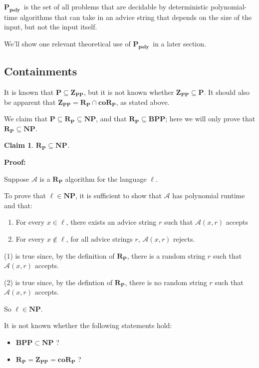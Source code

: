 \documentclass[11pt]{article}
\newcommand{\Pt}{\ensuremath{\mathbf{P}}}
\newcommand{\NP}{\ensuremath{\mathbf{NP}}}
\newcommand{\BPP}{\ensuremath{\mathbf{BPP}}}
\newcommand{\ZPP}{\ensuremath{\mathbf{Z_{PP}}}}
\newcommand{\RP}{\ensuremath{\mathbf{R_{P}}}}
\newcommand{\coRP}{\ensuremath{\mathbf{coR_{P}}}}
\newcommand{\Ppoly}{\ensuremath{\mathbf{P_{poly}}}}
\newcommand{\Alg}{\ensuremath{\mathcal{A}}}
\newtheorem{claim}[theorem]{Claim}
\begin{document}
\Ppoly\ is the set of all problems that are decidable by deterministic polynomial-time algorithms that can take in an advice string that depends on the size of the input, but not the input itself.

We'll show one relevant theoretical use of \Ppoly\ in a later section.

\subsection{Containments}

It is known that $\Pt\subseteq\ZPP$, but it is not known whether $\ZPP\subseteq\Pt$.
It should also be apparent that $\ZPP = \RP\cap\coRP$, as stated above.

We claim that $\Pt\subseteq\RP\subseteq\NP$, and that $\RP\subseteq\BPP$; here we will only prove that $\RP\subseteq\NP$.

\begin{claim}
$\RP \subseteq \NP$.
\end{claim}

\begin{leftbar}

\textbf{Proof:}

Suppose $\Alg$ is a $\RP$ algorithm for the language $\ell$.

To prove that $\ell \in \NP$, it is sufficient to show that $\Alg$ has polynomial runtime and that:
\begin{enumerate}
  \item For every $x \in \ell$, there exists an advice string $r$ such that $\Alg(x,r)$ accepts
  \item For every $x \not\in \ell$, for all advice strings $r$, $\Alg(x,r)$ rejects.
\end{enumerate}

(1) is true since, by the definition of $\RP$, there is a random string $r$ such that $\Alg(x,r)$ accepts.

(2) is true since, by the defintion of $\RP$, there is no random string $r$ such that $\Alg(x,r)$ accepts.

So $\ell \in \NP$.

\end{leftbar}


It is not known whether the following statements hold:

\begin{itemize}
  \item $\BPP\subset\NP$ ?
  \item $\RP=\ZPP=\coRP$ ?
\end{itemize}
\end{document}
